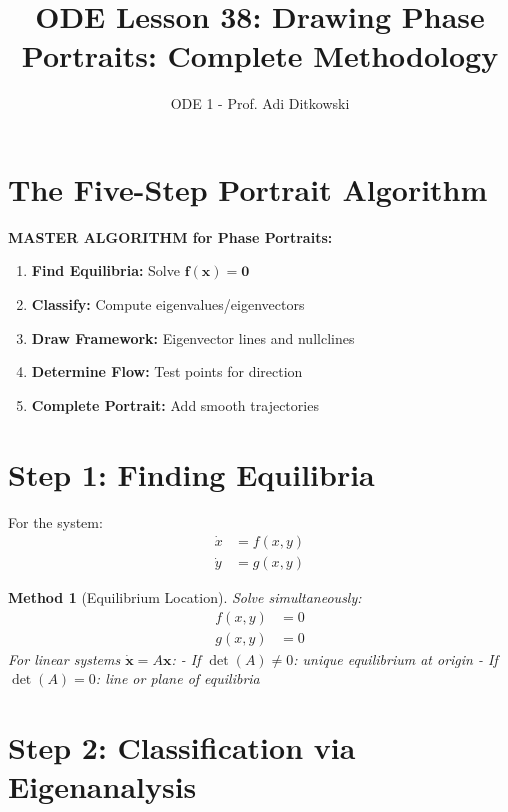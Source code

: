 \documentclass[12pt]{article}
\title{ODE Lesson 38: Drawing Phase Portraits: Complete Methodology}
\author{ODE 1 - Prof. Adi Ditkowski}
\date{}
\newtheorem{method}{Method}
\begin{document}
\maketitle

\section{The Five-Step Portrait Algorithm}

\begin{stepbox}
\textbf{MASTER ALGORITHM for Phase Portraits:}
\begin{enumerate}
    \item \textbf{Find Equilibria:} Solve $\mathbf{f}(\mathbf{x}) = \mathbf{0}$
    \item \textbf{Classify:} Compute eigenvalues/eigenvectors
    \item \textbf{Draw Framework:} Eigenvector lines and nullclines
    \item \textbf{Determine Flow:} Test points for direction
    \item \textbf{Complete Portrait:} Add smooth trajectories
\end{enumerate}
\end{stepbox}

\section{Step 1: Finding Equilibria}

For the system:
\begin{align}
\dot{x} &= f(x,y) \\
\dot{y} &= g(x,y)
\end{align}

\begin{method}[Equilibrium Location]
Solve simultaneously:
\begin{align}
f(x,y) &= 0 \\
g(x,y) &= 0
\end{align}
For linear systems $\dot{\mathbf{x}} = A\mathbf{x}$:
- If $\det(A) \neq 0$: unique equilibrium at origin
- If $\det(A) = 0$: line or plane of equilibria
\end{method}

\section{Step 2: Classification via Eigenanalysis}
\end{document}
